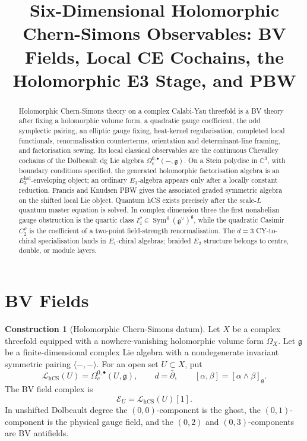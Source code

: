 \documentclass[11pt]{amsart}
\title[Six-Dimensional hCS Observables]{Six-Dimensional Holomorphic Chern-Simons Observables: BV Fields, Local CE Cochains, the Holomorphic E3 Stage, and PBW}
\author{}
\date{}
\providecommand{\C}{\mathbb{C}}
\providecommand{\dbar}{\bar{\partial}}
\providecommand{\fg}{\mathfrak{g}}
\providecommand{\Sym}{\operatorname{Sym}}
\providecommand{\hCS}{\operatorname{hCS}}
\providecommand{\cE}{\mathcal{E}}
\providecommand{\cL}{\mathcal{L}}
\providecommand{\Eone}{E_1}
\providecommand{\Etwo}{E_2}
\providecommand{\Ethree}{E_3}
\theoremstyle{plain}
\theoremstyle{definition}
\newtheorem{construction}[theorem]{Construction}
\theoremstyle{remark}
\begin{document}
\begin{abstract}
Holomorphic Chern-Simons theory on a complex Calabi-Yau threefold is a
BV theory after fixing a holomorphic volume form, a quadratic gauge
coefficient, the odd symplectic pairing, an elliptic gauge fixing,
heat-kernel regularisation, completed local functionals,
renormalisation counterterms, orientation and determinant-line framing,
and factorisation sewing. Its local classical observables are the
continuous Chevalley cochains of the Dolbeault dg Lie algebra
\(\Omega^{0,\bullet}_c(-,\fg)\). On a Stein polydisc in \(\C^3\), with
boundary conditions specified, the generated holomorphic factorisation
algebra is an \(\Ethree^{\mathrm{hol}}\)-enveloping object; an ordinary
\(\Ethree\)-algebra appears only after a locally constant reduction.
Francis and Knudsen PBW gives the associated graded symmetric algebra
on the shifted local Lie object. Quantum hCS exists precisely after the
scale-\(L\) quantum master equation is solved. In complex dimension
three the first nonabelian gauge obstruction is the quartic class
\(I_4^\rho\in\Sym^4(\fg^\vee)^\fg\), while the quadratic Casimir
\(C_2^\rho\) is the coefficient of a two-point field-strength
renormalisation. The \(d=3\) CY-to-chiral specialisation lands in
\(\Eone\)-chiral algebras; braided \(\Etwo\) structure belongs to
centre, double, or module layers.
\end{abstract}

\maketitle
\tableofcontents

\section{BV Fields}
\label{sec:bv-fields}

\begin{construction}[Holomorphic Chern-Simons datum]
\label{cons:hcs-datum}
Let \(X\) be a complex threefold equipped with a nowhere-vanishing
holomorphic volume form \(\Omega_X\). Let \(\fg\) be a finite-dimensional
complex Lie algebra with a nondegenerate invariant symmetric pairing
\(\langle-,-\rangle\). For an open set \(U\subset X\), put
\[
  \cL_{\hCS}(U)=\Omega^{0,\bullet}_c(U,\fg),
  \qquad
  d=\dbar,
  \qquad
  [\alpha,\beta]=[\alpha\wedge\beta]_\fg .
\]
The BV field complex is
\[
  \cE_U=\cL_{\hCS}(U)[1].
\]
In unshifted Dolbeault degree the \((0,0)\)-component is the ghost, the
\((0,1)\)-component is the physical gauge field, and the \((0,2)\) and
\((0,3)\)-components are BV antifields.
\end{construction}
\end{document}
